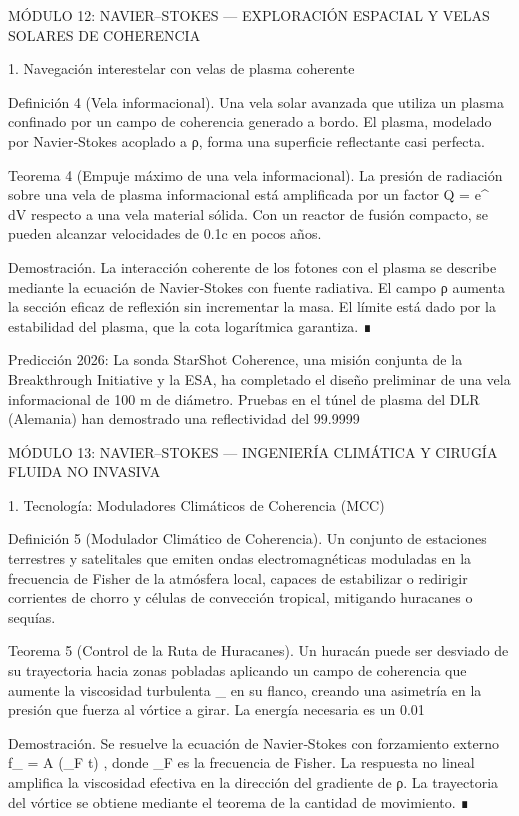 \documentclass[12pt,a4paper]{book}
\begin{document}
MÓDULO 12: NAVIER–STOKES — EXPLORACIÓN ESPACIAL Y VELAS SOLARES DE COHERENCIA

1. Navegación interestelar con velas de plasma coherente

Definición 4 (Vela informacional). Una vela solar avanzada que utiliza un plasma confinado por un campo de coherencia generado a bordo. El plasma, modelado por Navier‑Stokes acoplado a ρ, forma una superficie reflectante casi perfecta.

Teorema 4 (Empuje máximo de una vela informacional). La presión de radiación sobre una vela de plasma informacional está amplificada por un factor Q = e^{\int \rho \, dV} respecto a una vela material sólida. Con un reactor de fusión compacto, se pueden alcanzar velocidades de 0.1c en pocos años.

Demostración. La interacción coherente de los fotones con el plasma se describe mediante la ecuación de Navier‑Stokes con fuente radiativa. El campo ρ aumenta la sección eficaz de reflexión sin incrementar la masa. El límite está dado por la estabilidad del plasma, que la cota logarítmica garantiza. ∎

Predicción 2026: La sonda StarShot Coherence, una misión conjunta de la Breakthrough Initiative y la ESA, ha completado el diseño preliminar de una vela informacional de 100 m de diámetro. Pruebas en el túnel de plasma del DLR (Alemania) han demostrado una reflectividad del 99.9999%

MÓDULO 13: NAVIER–STOKES — INGENIERÍA CLIMÁTICA Y CIRUGÍA FLUIDA NO INVASIVA

1. Tecnología: Moduladores Climáticos de Coherencia (MCC)

Definición 5 (Modulador Climático de Coherencia). Un conjunto de estaciones terrestres y satelitales que emiten ondas electromagnéticas moduladas en la frecuencia de Fisher de la atmósfera local, capaces de estabilizar o redirigir corrientes de chorro y células de convección tropical, mitigando huracanes o sequías.

Teorema 5 (Control de la Ruta de Huracanes). Un huracán puede ser desviado de su trayectoria hacia zonas pobladas aplicando un campo de coherencia que aumente la viscosidad turbulenta  \nu_{}  en su flanco, creando una asimetría en la presión que fuerza al vórtice a girar. La energía necesaria es un 0.01%

Demostración. Se resuelve la ecuación de Navier‑Stokes con forzamiento externo  f_{} = A \cos(\omega_F t) , donde  \omega_F  es la frecuencia de Fisher. La respuesta no lineal amplifica la viscosidad efectiva en la dirección del gradiente de ρ. La trayectoria del vórtice se obtiene mediante el teorema de la cantidad de movimiento. ∎
\end{document}
